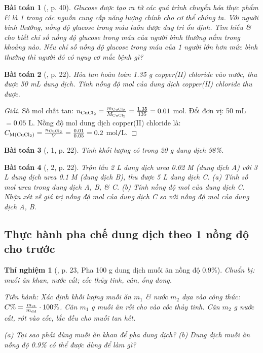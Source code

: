 \documentclass{article}
\newtheorem{baitoan}{Bài toán}
\newtheorem{thinghiem}{Thí nghiệm}
\begin{document}
\begin{baitoan}[\cite{SGK_KHTN_8_Canh_Dieu}, p. 40]
	Glucose được tạo ra từ các quá trình chuyển hóa thực phẩm \& là 1 trong các nguồn cung cấp năng lượng chính cho cơ thể chúng ta. Với người bình thường, nồng độ glucose trong máu luôn được duy trì ổn định. Tìm hiểu \& cho biết chỉ số nồng độ glucose trong máu của người bình thường nằm trong khoảng nào. Nếu chỉ số nồng độ glucose trong máu của 1 người lớn hơn mức bình thường thì người đó có nguy cơ mắc bệnh gì?
\end{baitoan}

\begin{baitoan}[\cite{SGK_KHTN_8_KNTTVCS}, p. 22]
	Hòa tan hoàn toàn \emph{1.35 g} copper(II) chloride vào nước, thu được \emph{50 mL} dung dịch. Tính nồng độ mol của dung dịch copper(II) chloride thu được.
\end{baitoan}

\begin{proof}[Giải]
	Số mol chất tan: $n_{\ce{CuCl2}} = \frac{m_{\ce{CuCl2}}}{M_{\ce{CuCl2}}} = \frac{1.35}{135} = 0.01$ mol. Đổi đơn vị: 50 mL $= 0.05$ L. Nồng độ mol dung dịch copper(II) chloride là: $C_{\rm M(\ce{CuCl2})} = \frac{n_{\ce{CuCl2}}}{V} = \frac{0.01}{0.05} = 0.2$ mol\texttt{/}L.
\end{proof}

\begin{baitoan}[\cite{SGK_KHTN_8_KNTTVCS}, 1, p. 22]
	Tính khối lượng \emph{} có trong \emph{20 g} dung dịch \emph{ 98\%}.
\end{baitoan}

\begin{baitoan}[\cite{SGK_KHTN_8_KNTTVCS}, 2, p. 22]
	Trộn lẫn \emph{2 L} dung dịch urea \emph{0.02 M} (dung dịch A) với \emph{3 L} dung dịch urea \emph{0.1 M} (dung dịch B), thu được \emph{5 L} dung dịch C. (a) Tính số mol urea trong dung dịch A, B, \& C. (b) Tính nồng độ mol của dung dịch C. Nhận xét về giá trị nồng độ mol của dung dịch C so với nồng độ mol của dung dịch A, B.
\end{baitoan}

\subsection{Thực hành pha chế dung dịch theo 1 nồng độ cho trước}

\begin{thinghiem}[\cite{SGK_KHTN_8_KNTTVCS}, p. 23, Pha 100 g dung dịch muối ăn nồng độ 0.9\%]
	\emph{Chuẩn bị:} muối ăn khan, nước cất; cốc thủy tinh, cân, ống đong.
	
	\emph{Tiến hành:} Xác định khối lượng muối ăn $m_1$ \& nước $m_2$ dựa vào công thức: $C\% = \frac{m_{\rm ct}}{m_{\rm dd}}\cdot100\%$. Cân $m_1$ g muối ăn rồi cho vào cốc thủy tinh. Cân $m_2$ g nước cất, rót vào cốc, lắc đều cho muối tan hết.
	
	(a) Tại sao phải dùng muối ăn khan để pha dung dịch? (b) Dung dịch muối ăn nồng độ \emph{0.9\%} có thể được dùng để làm gì?
\end{thinghiem}
\end{document}
